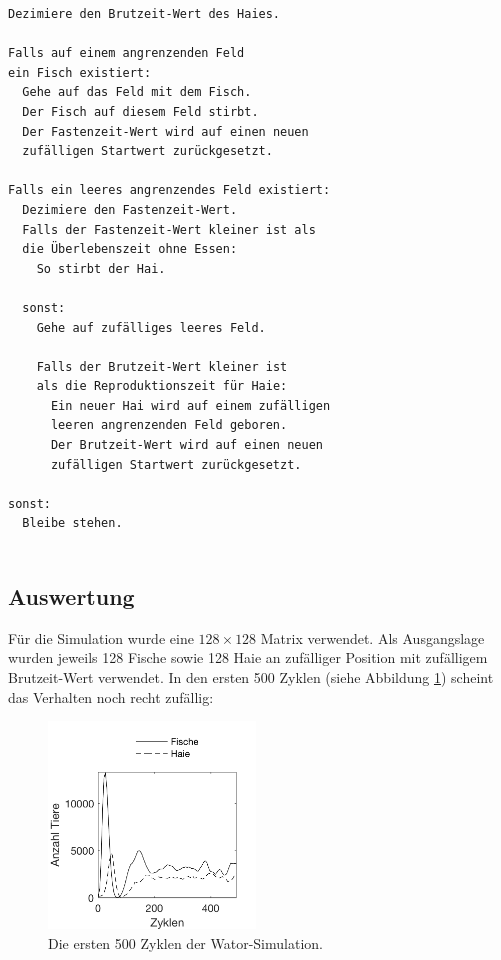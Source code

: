 \documentclass[a4paper,twoside]{article}
\begin{document}
	\begin{small}
	\begin{verbatim}
Dezimiere den Brutzeit-Wert des Haies.
		
Falls auf einem angrenzenden Feld
ein Fisch existiert:
  Gehe auf das Feld mit dem Fisch.
  Der Fisch auf diesem Feld stirbt.
  Der Fastenzeit-Wert wird auf einen neuen
  zufälligen Startwert zurückgesetzt.
		    
Falls ein leeres angrenzendes Feld existiert:
  Dezimiere den Fastenzeit-Wert.
  Falls der Fastenzeit-Wert kleiner ist als 
  die Überlebenszeit ohne Essen:
    So stirbt der Hai.
		        
  sonst:
    Gehe auf zufälliges leeres Feld.
		        
    Falls der Brutzeit-Wert kleiner ist
    als die Reproduktionszeit für Haie:
      Ein neuer Hai wird auf einem zufälligen
      leeren angrenzenden Feld geboren.
      Der Brutzeit-Wert wird auf einen neuen
      zufälligen Startwert zurückgesetzt.
		
sonst:
  Bleibe stehen. 
		
	\end{verbatim}
	\end{small}
	
	\newpage
	
	\subsection{Auswertung}
	Für die Simulation wurde eine \(128 \times 128\) Matrix verwendet. Als Ausgangslage wurden jeweils 128 Fische sowie 128 Haie an zufälliger Position mit zufälligem Brutzeit-Wert verwendet. In den ersten 500 Zyklen (siehe Abbildung \ref{fig:wator_diagram_100}) scheint das Verhalten noch recht zufällig:
	\begin{figure}[!h]
  		\centering
 		\includegraphics[width=5.5cm]{Diagramme/wator_diagram_100.png}
  		\caption{Die ersten 500 Zyklen der Wator-Simulation.}
  		\label{fig:wator_diagram_100}
	\end{figure}
	
\end{document}
